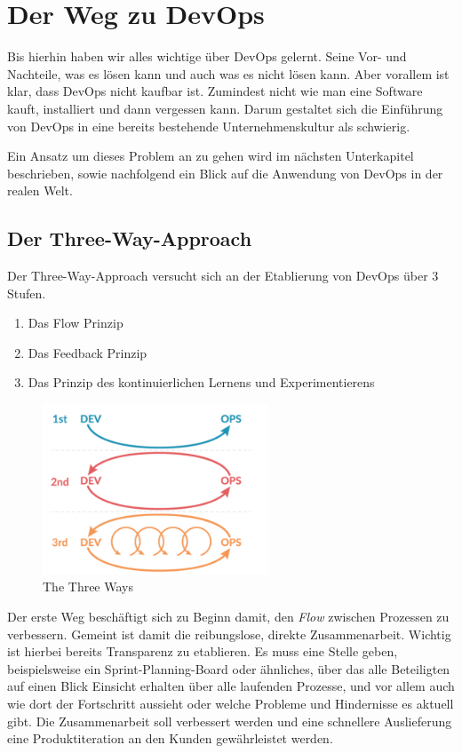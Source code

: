 \chapter{Der Weg zu DevOps} %

Bis hierhin haben wir alles wichtige über DevOps gelernt. Seine Vor- und Nachteile, was es lösen kann und auch was es nicht lösen kann. Aber vorallem ist klar, dass DevOps nicht kaufbar ist. Zumindest nicht wie man eine Software kauft, installiert und dann vergessen kann. Darum gestaltet sich die Einführung von \ac{DevOps} in eine bereits bestehende Unternehmenskultur als schwierig.

Ein Ansatz um dieses Problem an zu gehen wird im nächsten Unterkapitel beschrieben, sowie nachfolgend ein Blick auf die Anwendung von \ac{DevOps} in der realen Welt.


\section{Der Three-Way-Approach}

Der Three-Way-Approach versucht sich an der Etablierung von \ac{DevOps} über 3 Stufen. \cite{nine:2018}

\begin{enumerate}
\item Das Flow Prinzip
\item Das Feedback Prinzip
\item Das Prinzip des kontinuierlichen Lernens und Experimentierens
\end{enumerate}

\begin{figure}[h]
\centering
\includegraphics[width=0.6\textwidth]{Graphics/three_ways}
\caption{The Three Ways \cite{curra:2020}}
\end{figure}

Der erste Weg beschäftigt sich zu Beginn damit, den \textit{Flow} zwischen Prozessen zu verbessern. Gemeint ist damit die \glqq reibungslose, direkte Zusammenarbeit\grqq \cite{nine:2018}. Wichtig ist hierbei bereits Transparenz zu etablieren. Es muss eine Stelle geben, beispielsweise ein Sprint-Planning-Board oder ähnliches, über das alle Beteiligten auf einen Blick Einsicht erhalten über alle laufenden Prozesse, und vor allem auch wie dort der Fortschritt aussieht oder welche Probleme und Hindernisse es aktuell gibt. Die Zusammenarbeit soll verbessert werden und eine schnellere Auslieferung eine Produktiteration an den Kunden gewährleistet werden.

